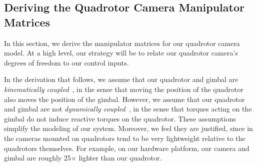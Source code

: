 % 







\subsection{Deriving the Quadrotor Camera Manipulator Matrices}
\label{sec:ch2:manipulator_detail}

In this section, we derive the manipulator matrices for our quadrotor camera model.
At a high level, our strategy will be to relate our quadrotor camera's degrees of freedom to our control inputs.

In the derivation that follows, we assume that our quadrotor and gimbal are \emph{kinematically coupled}~\cite{kondak:2013}, in the sense that moving the position of the quadrotor also moves the position of the gimbal. However, we assume that our quadrotor and gimbal are not \emph{dynamically coupled}~\cite{kondak:2013}, in the sense that torques acting on the gimbal do not induce reactive torques on the quadrotor.
These assumptions simplify the modeling of our system. Moreover, we feel they are justified, since in the cameras mounted on quadrotors tend to be very lightweight relative to the quadrotors themselves. For example, on our hardware platform, our camera and gimbal are roughly 25$\times$ lighter than our quadrotor.

